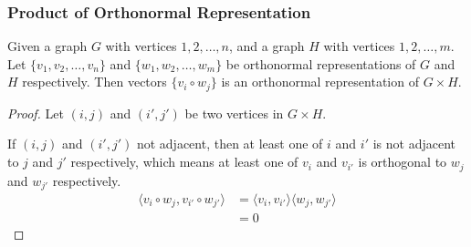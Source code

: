       \begin{frame}
            \frametitle{Product of Orthonormal Representation}

            \begin{lemma}
                  Given a graph $ G $ with vertices $ 1,2,\dots,n $, and a graph $ H $ with vertices $ 1,2,\dots,m $.
                  Let $ \{v_1, v_2, \dots, v_n\} $ and $ \{w_1, w_2, \dots, w_m\} $ be orthonormal representations of $ G $ and $ H $ respectively.
                  Then vectors $\{ v_{i}\circ w_{j} \}$ is an orthonormal representation of $ G \times H $.
            \end{lemma}

            \pause

            \begin{proof}
                  Let $(i,j)$ and $(i',j')$ be two vertices in $ G \times H $.

                  If $ (i,j) $ and $ (i',j') $ not adjacent, then at least one of $ i $ and $ i' $ is not adjacent to $ j $ and $ j' $ respectively, which means at least one of $ v_i $ and $ v_{i'} $ is orthogonal to $ w_j $ and $ w_{j'} $ respectively.
                  \begin{align}
                        \langle v_i \circ w_j, v_{i'} \circ w_{j'} \rangle &= \langle v_i, v_{i'} \rangle \langle w_j, w_{j'} \rangle \\
                        &= 0
                  \end{align}
            \end{proof}
      \end{frame}